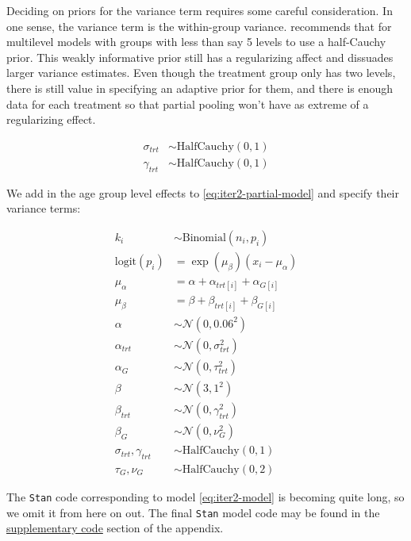 \documentclass[11pt, oneside, openany]{scrbook}
\begin{document}
Deciding on priors for the variance term requires some careful consideration. In one sense, the variance term is the within-group variance. \citet{gelman2006prior} recommends that for multilevel models with groups with less than say 5 levels to use a half-Cauchy prior. This weakly informative prior still has a regularizing affect and dissuades larger variance estimates. Even though the treatment group only has two levels, there is still value in specifying an adaptive prior for them, and there is enough data for each treatment so that partial pooling won't have as extreme of a regularizing effect.


\begin{align*}
\sigma_{trt} &\sim \mathrm{HalfCauchy}(0, 1) \\
\gamma_{trt} &\sim \mathrm{HalfCauchy}(0, 1)
\end{align*}

We add in the age group level effects to \eqref{eq:iter2-partial-model} and specify their variance terms:


\begin{equation}
\begin{split}
k_i &\sim \mathrm{Binomial}(n_i, p_i) \\
\mathrm{logit}(p_i) &= \exp(\mu_\beta) (x_i - \mu_\alpha) \\
\mu_\alpha &= \alpha + \alpha_{trt[i]} + \alpha_{G[i]} \\
\mu_\beta &= \beta + \beta_{trt[i]} + \beta_{G[i]} \\
\alpha &\sim \mathcal{N}(0, 0.06^2) \\
\alpha_{trt} &\sim \mathcal{N}(0, \sigma_{trt}^2) \\
\alpha_{G} &\sim \mathcal{N}(0, \tau_{trt}^2) \\
\beta &\sim \mathcal{N}(3, 1^2) \\
\beta_{trt} &\sim \mathcal{N}(0, \gamma_{trt}^2) \\
\beta_{G} &\sim \mathcal{N}(0, \nu_{G}^2) \\
\sigma_{trt}, \gamma_{trt} &\sim \mathrm{HalfCauchy}(0, 1) \\
\tau_{G}, \nu_{G}  &\sim \mathrm{HalfCauchy}(0, 2)
\end{split}
\label{eq:iter2-model}
\end{equation}

The \texttt{Stan} code corresponding to model \eqref{eq:iter2-model} is becoming quite long, so we omit it from here on out. The final \texttt{Stan} model code may be found in the \protect\hyperlink{code}{supplementary code} section of the appendix.
\end{document}
